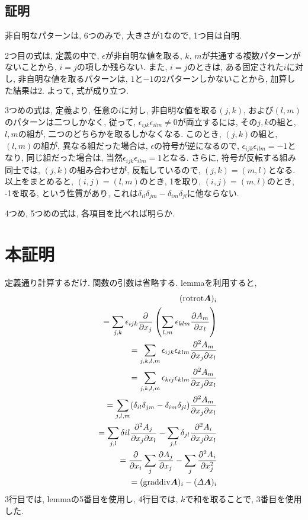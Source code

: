 \documentclass{jsarticle}
\newcommand*{\mbold}[1]{\mbox{\boldmath $#1$}}
\newcommand*{\grad}{{\rm grad}}
\newcommand*{\divg}{{\rm div}}
\newcommand*{\rot}{{\rm rot}}
\begin{document}
\subsection{証明}
非自明なパターンは, 6つのみで, 大きさが$1$なので, 1つ目は自明. 

2つ目の式は, 定義の中で, $\epsilon$が非自明な値を取る, $k$, $m$が共通する複数パターンがないことから, 
$i = j$の項しか残らない. 
また, $i = j$のときは, ある固定された$i$に対し, 非自明な値を取るパターンは, $1$と$-1$の2パターンしかないことから, 
加算した結果は$2$. 
よって, 式が成り立つ. 

3つめの式は, 定義より, 任意の$i$に対し, 非自明な値を取る$(j, k)$, および$(l, m)$のパターンは二つしかなく, 
従って, 
$\epsilon_{ijk}\epsilon_{ilm} \neq 0$が両立するには, その$j, k$の組と, $l, m$の組が, 二つのどちらかを取るしかなくなる. 
このとき, $(j, k)$の組と, $(l, m)$の組が, 異なる組だった場合は, $\epsilon$の符号が逆になるので, $\epsilon_{ijk}\epsilon_{ilm} = -1$となり, 
同じ組だった場合は, 当然$\epsilon_{ijk}\epsilon_{ilm} = 1$となる. 
さらに, 符号が反転する組み同士では, $(j, k)$の組み合わせが, 反転しているので, $(j, k) = (m, l)$となる. 
以上をまとめると, $(i, j) = (l, m)$のとき, 1を取り, $(i, j) = (m, l)$のとき, -1を取る, という性質があり, 
これは$\delta_{il}\delta_{jm} - \delta_{im}\delta_{jl}$に他ならない. 

4つめ, 5つめの式は, 各項目を比べれば明らか. 

\section*{本証明}
定義通り計算するだけ. 関数の引数は省略する. 
lemmaを利用すると, 
\begin{eqnarray}
  && (\rot\rot\mbold{A})_i \nonumber \\
  && = \sum_{j, k}\epsilon_{ijk}\frac{\partial}{\partial x_j} \left(\sum_{l, m}\epsilon_{klm}\frac{\partial A_m}{\partial x_l}\right) \nonumber \\
  && = \sum_{j, k, l, m}\epsilon_{ijk}\epsilon_{klm}\frac{\partial^2 A_m}{\partial x_j \partial x_l} \nonumber \\
  && = \sum_{j, k, l, m}\epsilon_{kij}\epsilon_{klm}\frac{\partial^2 A_m}{\partial x_j \partial x_l} \nonumber \\
  && = \sum_{j, l, m}(\delta_{il}\delta_{jm} - \delta_{im}\delta_{jl})\frac{\partial^2 A_m}{\partial x_j \partial x_l} \nonumber \\
  && = \sum_{j, l}\delta{il}\frac{\partial^2 A_j}{\partial x_j \partial x_l} - \sum_{j, l}\delta_{jl}\frac{\partial^2 A_i}{\partial x_j \partial x_l}\nonumber \\
  && = \frac{\partial}{\partial x_i}\sum_j\frac{\partial A_j}{\partial x_j} - \sum_j \frac{\partial^2 A_i}{\partial x_j^2} \nonumber \\
  && = (\grad \divg\mbold{A})_i - (\varDelta \mbold{A})_i
\end{eqnarray}
3行目では, lemmaの5番目を使用し, 4行目では, $k$で和を取ることで, 3番目を使用した.
\end{document}
